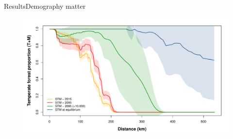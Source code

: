 \documentclass[10pt,aspectratio=149]{beamer}
\begin{document}

\begin{frame}{Results}{Demography matter}

  \begin{figure}
  	\includegraphics[width=.70\paperwidth]{Figs/propLat_wth_solved.pdf}
  \end{figure}

\end{frame}

\end{document}

